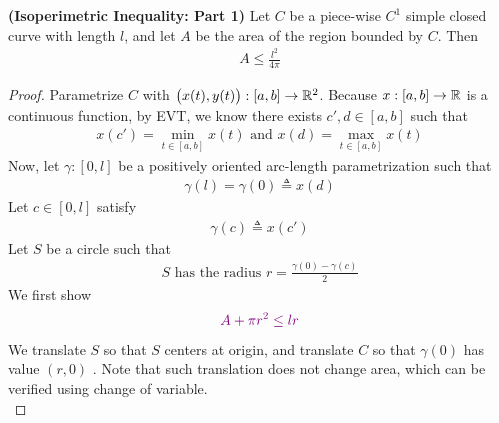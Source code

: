 \documentclass{report}
\begin{document}
\begin{theorem}
  \label{IIPI}
\textbf{(Isoperimetric Inequality: Part 1)} Let $C$ be a piece-wise $C^1$ simple closed curve with length  $l$, and let  $A$ be the area of the region bounded by  $C$. Then 
 \begin{align*}
A\leq \frac{l^2}{4\pi}
\end{align*}
\end{theorem}
\begin{proof}
Parametrize $C$  with $\big(x(t),y(t) \big):[a,b]\rightarrow \mathbb{R}^2$. Because $x:[a,b]\rightarrow \mathbb{R}$ is a continuous function, by EVT, we know there exists $c',d \in [a,b]$ such that 
\begin{align*}
x(c')=\min _{t\in [a,b]}x(t) \text{ and }x(d)=\max_{t\in [a,b]}x(t)
\end{align*}
Now, let $\gamma :[0,l]$ be a positively oriented arc-length parametrization such that 
\begin{align*}
\gamma (l)=\gamma (0)\triangleq x(d)
\end{align*}
Let $c \in [0,l]$ satisfy 
\begin{align*}
\gamma (c)\triangleq x(c')
\end{align*}
Let $S$ be a circle such that 
\begin{align*}
S\text{ has the radius }r=\frac{\gamma (0)-\gamma (c)}{2}
\end{align*}
We first show 
\begin{align}
  \textcolor{violet}{A+\pi r^2\leq lr}
\end{align}
We translate $S$ so that $S$ centers at origin, and translate  $C$ so that  $\gamma (0)$ has value $(r,0)$ .  Note that such translation does not change area, which can be verified using change of variable.\\


\end{proof}
\end{document}

